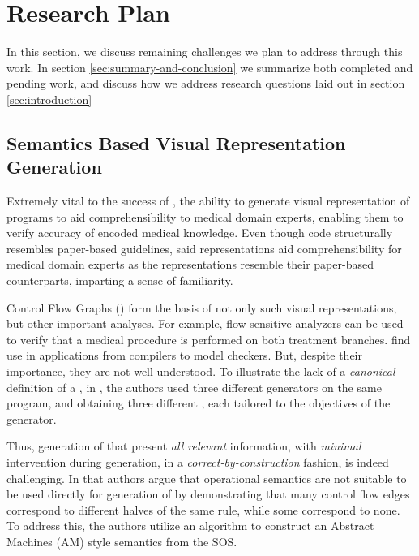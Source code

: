\section{Research Plan}

In this section, we discuss remaining challenges we plan to address through this work.
In section \ref{sec:summary-and-conclusion} we summarize both completed and
pending work, and discuss how we address research questions laid out in section
\ref{sec:introduction}

\subsection{Semantics Based Visual Representation Generation}\label{subsec:visual-representation-generation}

Extremely vital to the success of \MediK{}, the ability
to generate visual representation of \MediK{} programs to aid
comprehensibility to medical domain experts, enabling them to verify
accuracy of encoded medical knowledge. Even though \MediK{} code
structurally resembles paper-based guidelines, said
representations aid comprehensibility for medical
domain experts as the representations resemble their paper-based counterparts,
imparting a sense of familiarity.

Control Flow Graphs (\CFGs{}) form the basis of not only such visual
representations, but other important analyses. For example,
flow-sensitive analyzers can be used to verify that a medical procedure
is performed on both treatment branches.
\CFGs{} find use in applications from compilers to model checkers.
But, despite their importance, they are not well understood.
To illustrate the lack of a \emph{canonical} definition of a \CFG{},
in \cite{KoppelICFP22}, the authors
used three different \CFG{} generators
on the same program, and obtaining three different \CFGs{}, each
tailored to the objectives of the generator.

Thus, generation of \CFGs{} that present \emph{all relevant} information,
with \emph{minimal} intervention during generation, in a
\emph{correct-by-construction} fashion, is indeed challenging.
In \cite{KoppelICFP22} that authors argue that operational semantics
are not suitable to be used directly for generation of \CFGs{} by demonstrating
that many control flow edges correspond to different halves of the same rule,
while some correspond to none. To address this, the authors utilize an algorithm
to construct an Abstract Machines (AM) style semantics from the SOS.

